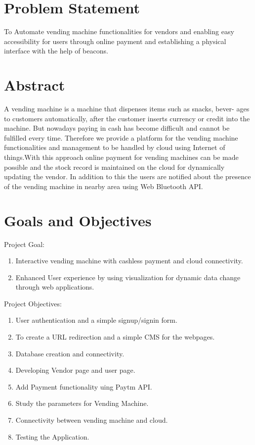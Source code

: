 \documentclass[oneside,a4paper,12pt]{report}
\begin{document}
\section{Problem Statement}
\label{sec:problem}
        To Automate vending machine functionalities for vendors and enabling easy accessibility for users through online payment and establishing a physical interface with the help of beacons. 
\section{Abstract}
A vending machine is a machine that dispenses items such as snacks, bever-
ages to customers automatically, after the customer inserts currency or credit
into the machine. But nowadays paying in cash has become difficult and cannot be fulfilled every time. Therefore we provide a platform for the vending machine functionalities and management to be handled by cloud using Internet of things.With this approach online payment for vending machines can be made possible and the
stock record is maintained on the cloud for dynamically updating the vendor.
In addition to this the users are notified about the presence of the vending
machine in nearby area  using Web Bluetooth API.
		    		   
\section{Goals and Objectives}
Project Goal:
\begin{enumerate}
\item Interactive vending machine with cashless payment and cloud
connectivity.
\item Enhanced User experience by using visualization for dynamic data
change through web applications.
\end{enumerate}	
Project Objectives:
\begin{enumerate}
\item User authentication and a simple signup/signin form.
\item To create a URL redirection and a simple CMS for the webpages. 
\item Database creation and connectivity.
\item Developing  Vendor page and user page.
\item Add Payment functionality uing Paytm API.
\item Study the parameters for Vending Machine.
\item Connectivity between vending machine and cloud.
\item Testing the Application. 
\end{enumerate}	
\end{document}
